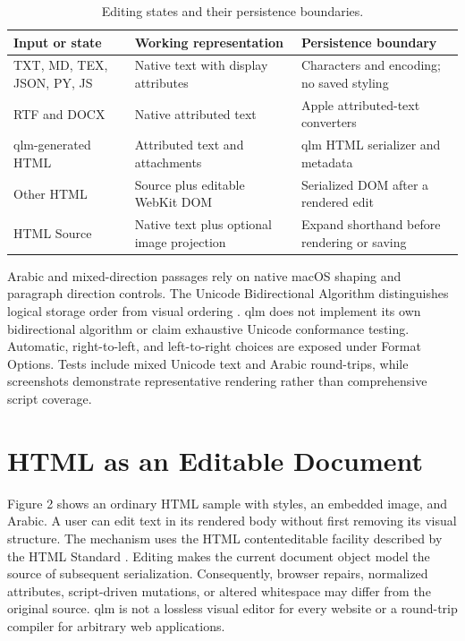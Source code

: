 \documentclass[manuscript,screen,nonacm]{acmart}
\begin{document}
\begin{table}[tbp]
\caption{Editing states and their persistence boundaries.}
\small
\begin{tabularx}{\linewidth}{lXX}
\toprule
Input or state & Working representation & Persistence boundary \\
\midrule
TXT, MD, TEX, JSON, PY, JS & Native text with display attributes & Characters and encoding; no saved styling \\
RTF and DOCX & Native attributed text & Apple attributed-text converters \\
qlm-generated HTML & Attributed text and attachments & qlm HTML serializer and metadata \\
Other HTML & Source plus editable WebKit DOM & Serialized DOM after a rendered edit \\
HTML Source & Native text plus optional image projection & Expand shorthand before rendering or saving \\
\bottomrule
\end{tabularx}
\end{table}

Arabic and mixed-direction passages rely on native macOS shaping and paragraph direction controls. The Unicode Bidirectional Algorithm distinguishes logical storage order from visual ordering \cite{bidi}. qlm does not implement its own bidirectional algorithm or claim exhaustive Unicode conformance testing. Automatic, right-to-left, and left-to-right choices are exposed under Format Options. Tests include mixed Unicode text and Arabic round-trips, while screenshots demonstrate representative rendering rather than comprehensive script coverage.

\section{HTML as an Editable Document}

Figure 2 shows an ordinary HTML sample with styles, an embedded image, and Arabic. A user can edit text in its rendered body without first removing its visual structure. The mechanism uses the HTML contenteditable facility described by the HTML Standard \cite{html}. Editing makes the current document object model the source of subsequent serialization. Consequently, browser repairs, normalized attributes, script-driven mutations, or altered whitespace may differ from the original source. qlm is not a lossless visual editor for every website or a round-trip compiler for arbitrary web applications.
\end{document}
